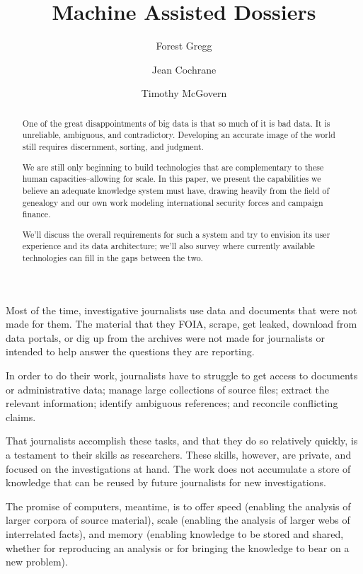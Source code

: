 \documentclass[format=siggraph, review=true]{acmart}
\title{Machine Assisted Dossiers}
\author{Forest Gregg}
\affiliation{DataMade}
\author{Jean Cochrane}
\affiliation{DataMade}
\author{Timothy McGovern}
\affiliation{O'Reilly Media}
\begin{document}
\begin{abstract}One of the great disappointments of big data is that so much
  of it is bad data. It is unreliable, ambiguous, and
  contradictory. Developing an accurate image of the world still
  requires discernment, sorting, and judgment.

  We are still only beginning to build technologies that are
  complementary to these human capacities--allowing for
  scale. In this paper, we present the capabilities we believe an
  adequate knowledge system must have, drawing heavily from the field
  of genealogy and our own work modeling international security forces
  and campaign finance.

  We'll discuss the overall requirements for such a system and try to envision its user experience and its data architecture; we'll also survey where currently available technologies can fill in the gaps between the two.
\end{abstract}

\maketitle

Most of the time, investigative journalists use data and documents
that were not made for them. The material that they FOIA, scrape, get
leaked, download from data portals, or dig up from the archives
were not made for journalists or intended to help answer the
questions they are reporting.

In order to do their work, journalists have to struggle to get access
to documents or administrative data; manage large collections of
source files; extract the relevant information; identify ambiguous
references; and reconcile conflicting claims.

That journalists accomplish these tasks, and that they do so relatively quickly,
is a testament to their skills as researchers. These skills, however, are
private, and focused on the investigations at hand. The work does not
accumulate a store of knowledge that can be reused by future
journalists for new investigations.

The promise of computers, meantime, is to offer speed (enabling the
analysis of larger corpora of source material), scale (enabling the
analysis of larger webs of interrelated facts), and memory (enabling
knowledge to be stored and shared, whether for reproducing an analysis
or for bringing the knowledge to bear on a new problem).
\end{document}
